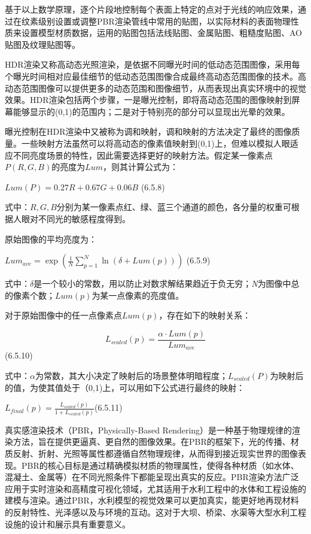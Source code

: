 基于以上数学原理，逐个片段地控制每个表面上特定的点对于光线的响应效果，通过在纹素级别设置或调整PBR渲染管线中常用的贴图，以实际材料的表面物理性质来设置模型材质数据，运用的贴图包括法线贴图、金属贴图、粗糙度贴图、AO贴图及纹理贴图等。

HDR渲染又称高动态光照渲染，是依据不同曝光时间的低动态范围图像，采用每个曝光时间相对应最佳细节的低动态范围图像合成最终高动态范围图像的技术。高动态范围图像可以提供更多的动态范围和图像细节，从而表现出真实环境中的视觉效果。HDR渲染包括两个步骤，一是曝光控制，即将高动态范围的图像映射到屏幕能够显示的(0,1)的范围内；二是对于特别亮的部分可以显现出光晕的效果。

曝光控制在HDR渲染中又被称为调和映射，调和映射的方法决定了最终的图像质量。一些映射方法虽然可以将高动态的像素值映射到(0,1)上，但难以模拟人眼适应不同亮度场景的特性，因此需要选择更好的映射方法。假定某一像素点\(P(R,G,B)\)的亮度为\(Lum\)，则其计算公式为：

\(Lum\left( P \right) = 0.27R + 0.67G + 0.06B\) (6.5.8)

式中：\(R,G,B\)分别为某一像素点红、绿、蓝三个通道的颜色，各分量的权重可根据人眼对不同光的敏感程度得到。

原始图像的平均亮度为：

\(Lu{m_{ave}} = \exp \left( {\frac{1}{N}\sum\limits_{p = 1}^N {\ln \left( {\delta + Lum\left( p \right)} \right)} } \right)\) (6.5.9)

式中：\(\delta\)是一个较小的常数，用以防止对数求解结果趋近于负无穷；\emph{N}为图像中总的像素个数；\(Lum(p)\)为某一点像素的亮度值。

对于原始图像中的任一点像素点\(Lum(p)\)，存在如下的映射关系：

\begin{equation}
{L_{scaled}}\left( p \right) = \frac{{\alpha  \cdot Lum\left( p \right)}}{{Lu{m_{ave}}}}
\end{equation}(6.5.10)

式中：\(\alpha\)为常数，其大小决定了映射后的场景整体明暗程度；\(L_{scaled}(P)\)为映射后的值，为使其值处于（0,1)上，可以用如下公式进行最终的映射：

\({L_{final}}\left( p \right) = \frac{{{L_{scaled}}\left( p \right)}}{{1 + {L_{scaled}}\left( p \right)}}\)(6.5.11)

真实感渲染技术（PBR，Physically-Based Rendering）是一种基于物理规律的渲染方法，旨在提供更逼真、更自然的图像效果。在PBR的框架下，光的传播、材质反射、折射、光照等属性都遵循自然物理规律，从而得到接近现实世界的图像表现。PBR的核心目标是通过精确模拟材质的物理属性，使得各种材质（如水体、混凝土、金属等）在不同光照条件下都能呈现出真实的反应。PBR渲染方法广泛应用于实时渲染和高精度可视化领域，尤其适用于水利工程中的水体和工程设施的建模与渲染。通过PBR，水利模型的视觉效果可以更加真实，能更好地再现材料的反射特性、光泽感以及与环境的互动。这对于大坝、桥梁、水渠等大型水利工程设施的设计和展示具有重要意义。

